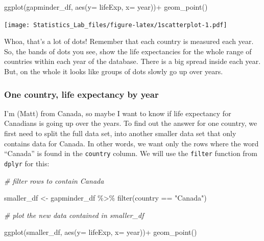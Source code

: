 \documentclass[
]{book}
\newenvironment{Shaded}{\begin{snugshade}}{\end{snugshade}}
\newcommand{\AttributeTok}[1]{\textcolor[rgb]{0.77,0.63,0.00}{#1}}
\newcommand{\CommentTok}[1]{\textcolor[rgb]{0.56,0.35,0.01}{\textit{#1}}}
\newcommand{\FunctionTok}[1]{\textcolor[rgb]{0.00,0.00,0.00}{#1}}
\newcommand{\NormalTok}[1]{#1}
\newcommand{\OtherTok}[1]{\textcolor[rgb]{0.56,0.35,0.01}{#1}}
\newcommand{\SpecialCharTok}[1]{\textcolor[rgb]{0.00,0.00,0.00}{#1}}
\newcommand{\StringTok}[1]{\textcolor[rgb]{0.31,0.60,0.02}{#1}}
\begin{document}
\begin{Shaded}
\begin{Highlighting}[]
\FunctionTok{ggplot}\NormalTok{(gapminder\_df, }\FunctionTok{aes}\NormalTok{(}\AttributeTok{y=}\NormalTok{ lifeExp, }\AttributeTok{x=}\NormalTok{ year))}\SpecialCharTok{+}
  \FunctionTok{geom\_point}\NormalTok{()}
\end{Highlighting}
\end{Shaded}

\texttt{[image: Statistics\_Lab\_files/figure-latex/1scatterplot-1.pdf]}

Whoa, that's a lot of dots! Remember that each country is measured each year. So, the bands of dots you see, show the life expectancies for the whole range of countries within each year of the database. There is a big spread inside each year. But, on the whole it looks like groups of dots slowly go up over years.

\hypertarget{one-country-life-expectancy-by-year}{%
\subsubsection{One country, life expectancy by year}\label{one-country-life-expectancy-by-year}}

I'm (Matt) from Canada, so maybe I want to know if life expectancy for Canadians is going up over the years. To find out the answer for one country, we first need to split the full data set, into another smaller data set that only contains data for Canada. In other words, we want only the rows where the word ``Canada'' is found in the \texttt{country} column. We will use the \texttt{filter} function from \texttt{dplyr} for this:

\begin{Shaded}
\begin{Highlighting}[]
\CommentTok{\# filter rows to contain Canada}

\NormalTok{smaller\_df }\OtherTok{\textless{}{-}}\NormalTok{ gapminder\_df }\SpecialCharTok{\%\textgreater{}\%} 
                 \FunctionTok{filter}\NormalTok{(country }\SpecialCharTok{==} \StringTok{"Canada"}\NormalTok{)}

\CommentTok{\# plot the new data contained in smaller\_df}

\FunctionTok{ggplot}\NormalTok{(smaller\_df, }\FunctionTok{aes}\NormalTok{(}\AttributeTok{y=}\NormalTok{ lifeExp, }\AttributeTok{x=}\NormalTok{ year))}\SpecialCharTok{+}
  \FunctionTok{geom\_point}\NormalTok{()}
\end{Highlighting}
\end{Shaded}
\end{document}
